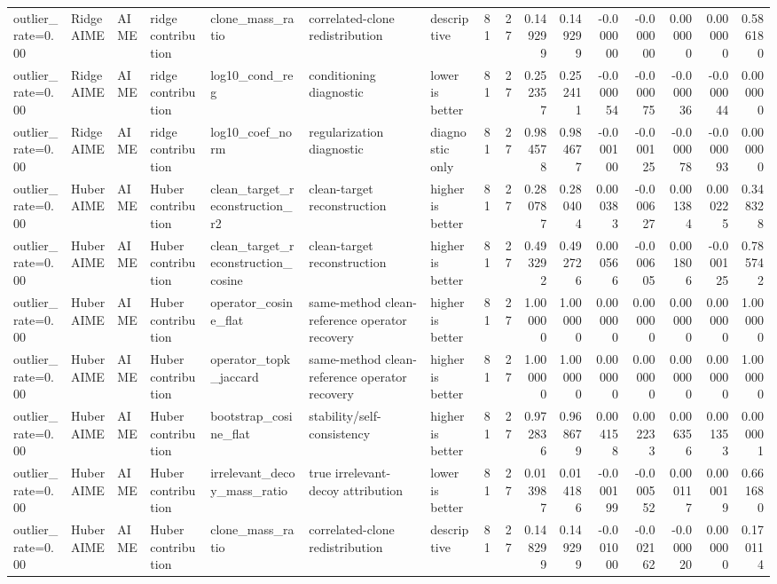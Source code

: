 \begin{table}[t]
\begin{tabular}{lllllllrrrrrrrrr}
outlier_rate=0.00 & RidgeAIME & AIME & ridge contribution & clone_mass_ratio & correlated-clone redistribution & descriptive & 81 & 27 & 0.149299 & 0.149299 & -0.000000 & -0.000000 & 0.000000 & 0.000000 & 0.586180 \\
outlier_rate=0.00 & RidgeAIME & AIME & ridge contribution & log10_cond_reg & conditioning diagnostic & lower is better & 81 & 27 & 0.252357 & 0.252411 & -0.000054 & -0.000075 & -0.000036 & -0.000044 & 0.000000 \\
outlier_rate=0.00 & RidgeAIME & AIME & ridge contribution & log10_coef_norm & regularization diagnostic & diagnostic only & 81 & 27 & 0.984578 & 0.984677 & -0.000100 & -0.000125 & -0.000078 & -0.000093 & 0.000000 \\
outlier_rate=0.00 & HuberAIME & AIME & Huber contribution & clean_target_reconstruction_r2 & clean-target reconstruction & higher is better & 81 & 27 & 0.280787 & 0.280404 & 0.000383 & -0.000627 & 0.001384 & 0.000225 & 0.348328 \\
outlier_rate=0.00 & HuberAIME & AIME & Huber contribution & clean_target_reconstruction_cosine & clean-target reconstruction & higher is better & 81 & 27 & 0.493292 & 0.492726 & 0.000566 & -0.000605 & 0.001806 & -0.000125 & 0.785742 \\
outlier_rate=0.00 & HuberAIME & AIME & Huber contribution & operator_cosine_flat & same-method clean-reference operator recovery & higher is better & 81 & 27 & 1.000000 & 1.000000 & 0.000000 & 0.000000 & 0.000000 & 0.000000 & 1.000000 \\
outlier_rate=0.00 & HuberAIME & AIME & Huber contribution & operator_topk_jaccard & same-method clean-reference operator recovery & higher is better & 81 & 27 & 1.000000 & 1.000000 & 0.000000 & 0.000000 & 0.000000 & 0.000000 & 1.000000 \\
outlier_rate=0.00 & HuberAIME & AIME & Huber contribution & bootstrap_cosine_flat & stability/self-consistency & higher is better & 81 & 27 & 0.972836 & 0.968679 & 0.004158 & 0.002233 & 0.006356 & 0.001353 & 0.000001 \\
outlier_rate=0.00 & HuberAIME & AIME & Huber contribution & irrelevant_decoy_mass_ratio & true irrelevant-decoy attribution & lower is better & 81 & 27 & 0.013987 & 0.014186 & -0.000199 & -0.000552 & 0.000117 & 0.000019 & 0.661680 \\
outlier_rate=0.00 & HuberAIME & AIME & Huber contribution & clone_mass_ratio & correlated-clone redistribution & descriptive & 81 & 27 & 0.148299 & 0.149299 & -0.001000 & -0.002162 & -0.000020 & 0.000000 & 0.170114 \\

\end{tabular}
\end{table}
